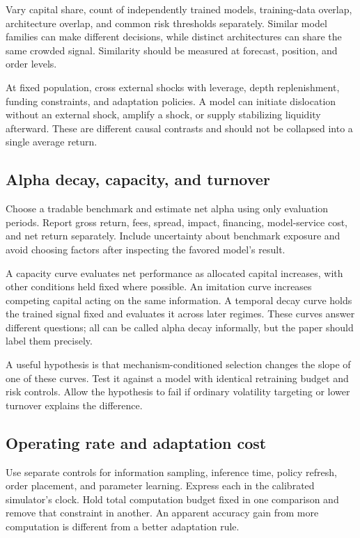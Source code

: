 Vary capital share, count of independently trained models, training-data overlap, architecture overlap, and common risk thresholds separately. Similar model families can make different decisions, while distinct architectures can share the same crowded signal. Similarity should be measured at forecast, position, and order levels.

At fixed population, cross external shocks with leverage, depth replenishment, funding constraints, and adaptation policies. A model can initiate dislocation without an external shock, amplify a shock, or supply stabilizing liquidity afterward. These are different causal contrasts and should not be collapsed into a single average return.

\subsection{Alpha decay, capacity, and turnover}
Choose a tradable benchmark and estimate net alpha using only evaluation periods. Report gross return, fees, spread, impact, financing, model-service cost, and net return separately. Include uncertainty about benchmark exposure and avoid choosing factors after inspecting the favored model's result.

A capacity curve evaluates net performance as allocated capital increases, with other conditions held fixed where possible. An imitation curve increases competing capital acting on the same information. A temporal decay curve holds the trained signal fixed and evaluates it across later regimes. These curves answer different questions; all can be called alpha decay informally, but the paper should label them precisely.

A useful hypothesis is that mechanism-conditioned selection changes the slope of one of these curves. Test it against a model with identical retraining budget and risk controls. Allow the hypothesis to fail if ordinary volatility targeting or lower turnover explains the difference.

\subsection{Operating rate and adaptation cost}
Use separate controls for information sampling, inference time, policy refresh, order placement, and parameter learning. Express each in the calibrated simulator's clock. Hold total computation budget fixed in one comparison and remove that constraint in another. An apparent accuracy gain from more computation is different from a better adaptation rule.


